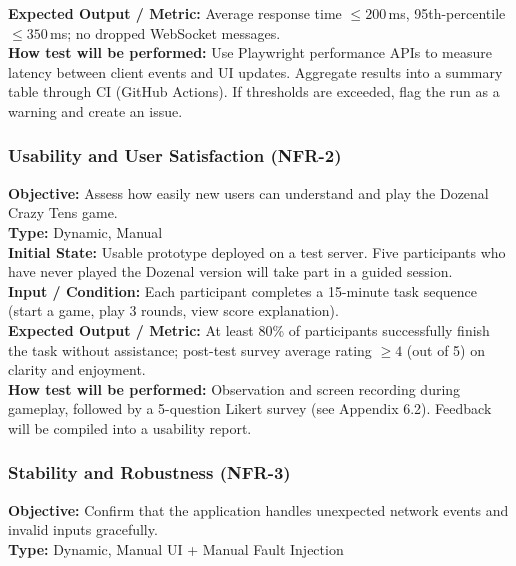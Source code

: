 \documentclass[12pt, titlepage]{article}
\begin{document}
    \textbf{Expected Output / Metric:} Average response time $\leq 200$\,ms, 95th-percentile $\leq 350$\,ms; no dropped WebSocket messages. \\

    \textbf{How test will be performed:}
    Use Playwright performance APIs to measure latency between client events and UI updates. Aggregate results into a summary table through CI (GitHub Actions).
    If thresholds are exceeded, flag the run as a warning and create an issue.

    \subsubsection{Usability and User Satisfaction (NFR-2)}
    \textbf{Objective:} Assess how easily new users can understand and play the Dozenal Crazy Tens game. \\

    \textbf{Type:} Dynamic, Manual \\

    \textbf{Initial State:} Usable prototype deployed on a test server. Five participants who have never played the Dozenal version will take part in a guided session. \\

    \textbf{Input / Condition:} Each participant completes a 15-minute task sequence (start a game, play 3 rounds, view score explanation). \\

    \textbf{Expected Output / Metric:} At least 80\% of participants successfully finish the task without assistance; post-test survey average rating $\geq 4$ (out of 5) on clarity and enjoyment. \\

    \textbf{How test will be performed:}
    Observation and screen recording during gameplay, followed by a 5-question Likert survey (see Appendix 6.2).
    Feedback will be compiled into a usability report.

    \subsubsection{Stability and Robustness (NFR-3)}
    \textbf{Objective:} Confirm that the application handles unexpected network events and invalid inputs gracefully. \\

    \textbf{Type:} Dynamic, Manual UI + Manual Fault Injection \\
\end{document}
